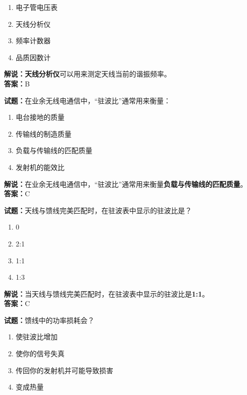 \documentclass{ctexbook}
\begin{document}
\begin{enumerate}[leftmargin=3em]
	\item 电子管电压表
	\item 天线分析仪
	\item 频率计数器
	\item 品质因数计
\end{enumerate}

\noindent\textbf{解说：}\textbf{天线分析仪}可以用来测定天线当前的谐振频率。\\\noindent\textbf{答案：}B


\bigskip


\noindent\textbf{试题：}在业余无线电通信中，“驻波比”通常用来衡量：

\begin{enumerate}[leftmargin=3em]
	\item 电台接地的质量
	\item 传输线的制造质量
	\item 负载与传输线的匹配质量
	\item 发射机的能效比
\end{enumerate}

\noindent\textbf{解说：}在业余无线电通信中，“驻波比”通常用来衡量\textbf{负载与传输线的匹配质量}。\\\noindent\textbf{答案：}C


\bigskip


\noindent\textbf{试题：}天线与馈线完美匹配时，在驻波表中显示的驻波比是？

\begin{enumerate}[leftmargin=3em]
	\item 0
	\item 2:1
	\item 1:1
	\item 1:3
\end{enumerate}

\noindent\textbf{解说：}当天线与馈线完美匹配时，在驻波表中显示的驻波比是\textbf{1:1}。\\\noindent\textbf{答案：}C


\bigskip


\noindent\textbf{试题：}馈线中的功率损耗会？

\begin{enumerate}[leftmargin=3em]
	\item 使驻波比增加
	\item 使你的信号失真
	\item 传回你的发射机并可能导致损害
	\item 变成热量
\end{enumerate}
\end{document}
